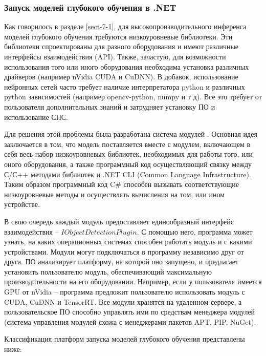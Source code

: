 \subsubsection{Запуск моделей глубокого обучения в .NET}

Как говорилось в разделе \ref{sect-7-1}, для высокопроизводительного инференса моделей глубокого обучения требуются низкоуровневые библиотеки. Эти библиотеки спроектированы для разного оборудования и имеют различные интерфейсы взаимодействия (API). Также, зачастую, для возможности использования того или иного оборудования необходима установка различных драйверов (например nVidia CUDA и CuDNN). В добавок, использование нейронных сетей часто требует наличие интерпретатора python и различных python зависимостей (например opencv-python, numpy и т д). Все это требует от пользователя дополнительных знаний и затрудняет установку ПО и использование СНС.

Для решения этой проблемы была разработана система модулей \cite{lib-plugins}. Основная идея заключается в том, что модель поставляется вместе с модулем, включающем в себя весь набор низкоуровневых библиотек, необходимых для работы того, или оного оборудования, а также программный код осуществляющий связку между С\slash С++ методами библиотек и .NET CLI (Common Language Infrastructure). Таким образом программный код C\# способен вызывать соответствующие низкоуровневые методы и осуществлять вычисления на том, или ином устройстве.

В свою очередь каждый модуль предоставляет единообразный интерфейс взаимодействия -- $IObjectDetectionPlugin$. С помощью него, программа может узнать, на каких операционных системах способен работать модуль и с какими устройствами. Модули могут подключаться в программу независимо друг от друга. ПО анализирует платформу, на которой оно запущено, и предлагает установить пользователю модуль, обеспечивающий максимальную производительности на его оборудовании. Например, если у пользователя имеется GPU от nVidia -- программа предложит пользователю использовать модуль с CUDA, CuDNN и TensorRT. Все модули хранятся на удаленном сервере, а пользовательское ПО способно управлять ими по средствам менеджера модулей (система управления модулей схожа с менеджерами пакетов APT, PIP, NuGet).

Классификация платформ запуска моделей глубокого обучения представлены ниже:

